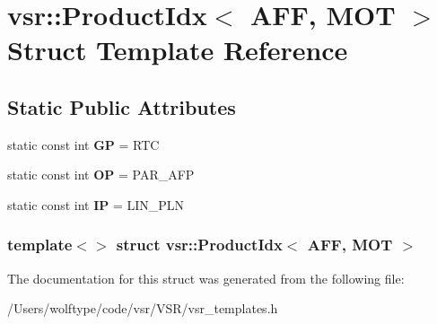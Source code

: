 \hypertarget{structvsr_1_1_product_idx_3_01_a_f_f_00_01_m_o_t_01_4}{\section{vsr\-:\-:Product\-Idx$<$ A\-F\-F, M\-O\-T $>$ Struct Template Reference}
\label{structvsr_1_1_product_idx_3_01_a_f_f_00_01_m_o_t_01_4}
}
\subsection*{Static Public Attributes}
\begin{DoxyCompactItemize}
\item 
\hypertarget{structvsr_1_1_product_idx_3_01_a_f_f_00_01_m_o_t_01_4_a29da22795daa782ef5b614a2d3a50e96}{static const int {\bfseries G\-P} = R\-T\-C}\label{structvsr_1_1_product_idx_3_01_a_f_f_00_01_m_o_t_01_4_a29da22795daa782ef5b614a2d3a50e96}

\item 
\hypertarget{structvsr_1_1_product_idx_3_01_a_f_f_00_01_m_o_t_01_4_acedd50e3e1b5f8049f6568ba1afaa3da}{static const int {\bfseries O\-P} = P\-A\-R\-\_\-\-A\-F\-P}\label{structvsr_1_1_product_idx_3_01_a_f_f_00_01_m_o_t_01_4_acedd50e3e1b5f8049f6568ba1afaa3da}

\item 
\hypertarget{structvsr_1_1_product_idx_3_01_a_f_f_00_01_m_o_t_01_4_acd66a3804540107c4c4a7a5ed9fd68d0}{static const int {\bfseries I\-P} = L\-I\-N\-\_\-\-P\-L\-N}\label{structvsr_1_1_product_idx_3_01_a_f_f_00_01_m_o_t_01_4_acd66a3804540107c4c4a7a5ed9fd68d0}

\end{DoxyCompactItemize}
\subsubsection*{template$<$$>$ struct vsr\-::\-Product\-Idx$<$ A\-F\-F, M\-O\-T $>$}



The documentation for this struct was generated from the following file\-:\begin{DoxyCompactItemize}
\item 
/\-Users/wolftype/code/vsr/\-V\-S\-R/vsr\-\_\-templates.\-h\end{DoxyCompactItemize}
